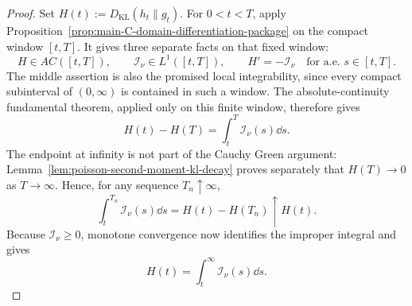 \begin{proof}
Set \(H(t):=D_{\mathrm{KL}}(h_t\|g_t)\).  For \(0<t<T\), apply
Proposition~\ref{prop:main-C-domain-differentiation-package} on the compact
window \([t,T]\).  It gives three separate facts on that fixed window:
\[
H\in AC([t,T]),\qquad
\mathcal I_\nu\in L^1([t,T]),\qquad
H'=-\mathcal I_\nu\quad\text{for a.e. }s\in[t,T].
\]
The middle assertion is also the promised local integrability, since every
compact subinterval of \((0,\infty)\) is contained in such a window.  The
absolute-continuity fundamental theorem, applied only on this finite window,
therefore gives
\[
H(t)-H(T)=\int_t^T \mathcal I_\nu(s)\dd s.
\]
The endpoint at infinity is not part of the Cauchy Green argument:
Lemma~\ref{lem:poisson-second-moment-kl-decay} proves separately that
\(H(T)\to0\) as \(T\to\infty\).  Hence, for any sequence \(T_n\uparrow\infty\),
\[
\int_t^{T_n}\mathcal I_\nu(s)\dd s=H(t)-H(T_n)\uparrow H(t).
\]
Because \(\mathcal I_\nu\ge0\), monotone convergence now identifies the
improper integral and gives
\[
H(t)=\int_t^\infty \mathcal I_\nu(s)\dd s .
\]
\end{proof}

